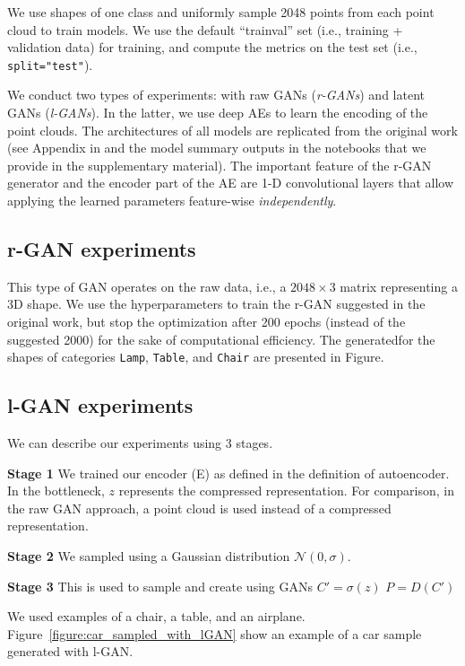 \documentclass[12pt]{article}
\begin{document}
    We use shapes of one class and uniformly sample 2048 points from each point cloud to train models. We use the default ``trainval'' set (i.e., training + validation data) for training, and compute the metrics on the test set (i.e., \verb|split="test"|).

    We conduct two types of experiments: with raw GANs (\textit{r-GANs}) and latent GANs (\textit{l-GANs}). In the latter, we use deep AEs to learn the encoding of the point clouds. The architectures of all models are replicated from the original work (see Appendix in \cite{pmlr-v80-achlioptas18a} and the model summary outputs in the notebooks that we provide in the supplementary material). The important feature of the r-GAN generator and the encoder part of the AE are 1-D convolutional layers that allow applying the learned parameters feature-wise \textit{independently}.

    \subsection{r-GAN experiments} This type of GAN operates on the raw data, i.e., a $2048 \times 3$ matrix representing a 3D shape. We use the hyperparameters to train the r-GAN suggested in the original work, but stop the optimization after 200 epochs (instead of the suggested 2000) for the sake of computational efficiency.
    The generatedfor the shapes of categories \verb|Lamp|, \verb|Table|, and \verb|Chair| are presented in Figure.

    \subsection{l-GAN experiments}

    We can describe our experiments using 3 stages.

    \textbf{Stage 1}
    We trained our encoder (E) as defined in the definition of autoencoder.
    In the bottleneck, $z$ represents the compressed representation.
    For comparison, in the raw GAN approach, a point cloud is used instead of a compressed representation.


    \textbf{Stage 2}
    We sampled using a Gaussian distribution $\mathcal{N}(0,\sigma)$.


    \textbf{Stage 3}
    This is used to sample and create using GANs
    $C' = \sigma(z)$
    $P = D(C')$

    We used examples of a chair, a table, and an airplane.
    Figure~\ref{figure:car_sampled_with_lGAN} show an example of a car sample generated with l-GAN.
\end{document}
